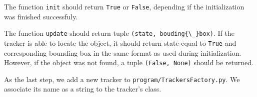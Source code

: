 The function \verb+init+ should return \verb+True+ or \verb+False+, depending
if the initialization was finished successfuly.

The function \verb+update+ should return tuple \verb+(state, bouding{\_}box)+.
If the tracker is able to locate the object, it should return state equal to
\verb+True+ and corresponding bounding box in the same format as used during
initialization. However, if the object was not found, a tuple \verb+(False, None)+ should be returned.

As the last step, we add a new tracker to \verb+program/TrackersFactory.py+. We
associate its name as a string to the tracker's class.
